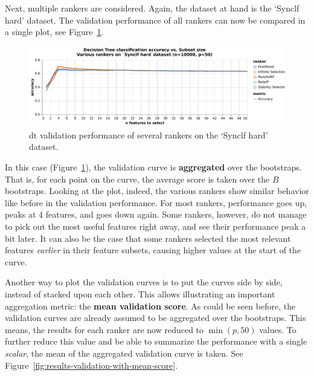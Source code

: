 \documentclass[../main.tex]{subfiles}
\begin{document}
Next, multiple rankers are considered. Again, the dataset at hand is the `Synclf hard' dataset. The validation performance of all rankers can now be compared in a single plot, see Figure~\ref{fig:results-validation-dt-various-rankers}.

\begin{figure}[ht]
    \centering
    \includegraphics[width=\linewidth]{report/images/results-validation-dt-various-rankers.pdf}
    \caption{\gls{dt} validation performance of several rankers on the `Synclf hard' dataset.}
    \label{fig:results-validation-dt-various-rankers}
\end{figure}

In this case (Figure~\ref{fig:results-validation-dt-various-rankers}), the validation curve is \textbf{aggregated} over the bootstraps. That is, for each point on the curve, the average score is taken over the $B$ bootstraps. Looking at the plot, indeed, the various rankers show similar behavior like before in the validation performance. For most rankers, performance goes up, peaks at 4 features, and goes down again. Some rankers, however, do not manage to pick out the most useful features right away, and see their performance peak a bit later. It can also be the case that some rankers selected the most relevant features \textit{earlier} in their feature subsets, causing higher values at the start of the curve.



Another way to plot the validation curves is to put the curves side by side, instead of stacked upon each other. This allows illustrating an important aggregation metric: the \textbf{mean validation score}. As could be seen before, the validation curves are already assumed to be aggregated over the bootstraps. This means, the results for each ranker are now reduced to $\min(p, 50)$ values. To further reduce this value and be able to summarize the performance with a single \textit{scalar}, the mean of the aggregated validation curve is taken. See Figure~\ref{fig:results-validation-with-mean-score}.
\end{document}
